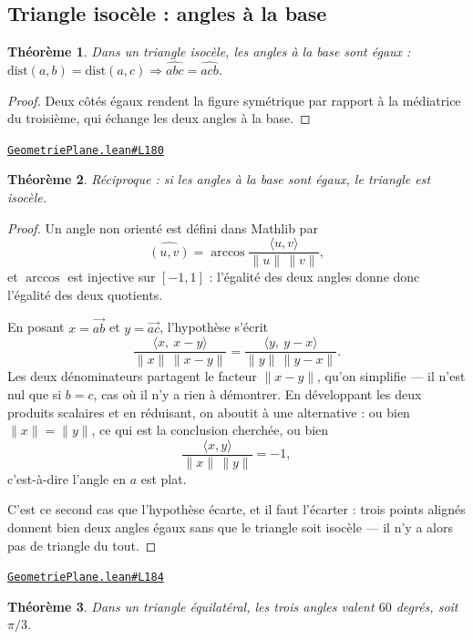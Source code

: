 \documentclass[11pt,a4paper]{article}
\theoremstyle{definition}
\theoremstyle{plain}
\newtheorem{theoreme}{Théorème}
\newcommand{\source}[2]{\par\smallskip\noindent\hfill{\footnotesize\href{#1}{\texttt{#2}}}\par\smallskip}
\begin{document}
\subsection{Triangle isocèle : angles à la base}

\begin{theoreme}
Dans un triangle isocèle, les angles à la base sont égaux :
$\mathrm{dist}(a,b) = \mathrm{dist}(a,c) \Rightarrow \widehat{abc} = \widehat{acb}$.
\end{theoreme}

\begin{proof}
Deux côtés égaux rendent la figure symétrique par rapport à la médiatrice du troisième,
qui échange les deux angles à la base.
\end{proof}
\source{https://github.com/Commutator-IO/learn-lean/blob/main/courses/01-college/02-geometrie-plane/GeometriePlane.lean\#L180}{GeometriePlane.lean\#L180}

\begin{theoreme}
Réciproque : si les angles à la base sont égaux, le triangle est isocèle.
\end{theoreme}

\begin{proof}
Un angle non orienté est défini dans Mathlib par
\[ \widehat{(u, v)} = \arccos \frac{\langle u, v\rangle}{\|u\|\,\|v\|} , \]
et $\arccos$ est injective sur $[-1, 1]$ : l'égalité des deux angles donne donc l'égalité
des deux quotients.

En posant $x = \vec{ab}$ et $y = \vec{ac}$, l'hypothèse s'écrit
\[ \frac{\langle x,\ x - y\rangle}{\|x\|\,\|x-y\|}
   = \frac{\langle y,\ y - x\rangle}{\|y\|\,\|y-x\|} . \]
Les deux dénominateurs partagent le facteur $\|x - y\|$, qu'on simplifie — il n'est nul que
si $b = c$, cas où il n'y a rien à démontrer. En développant les deux produits scalaires et
en réduisant, on aboutit à une alternative : ou bien $\|x\| = \|y\|$, ce qui est la
conclusion cherchée, ou bien
\[ \frac{\langle x, y\rangle}{\|x\|\,\|y\|} = -1 , \]
c'est-à-dire l'angle en $a$ est plat.

C'est ce second cas que l'hypothèse écarte, et il faut l'écarter : trois points alignés
donnent bien deux angles égaux sans que le triangle soit isocèle — il n'y a alors pas de
triangle du tout.
\end{proof}
\source{https://github.com/Commutator-IO/learn-lean/blob/main/courses/01-college/02-geometrie-plane/GeometriePlane.lean\#L184}{GeometriePlane.lean\#L184}

\begin{theoreme}
Dans un triangle équilatéral, les trois angles valent $60$ degrés, soit $\pi/3$.
\end{theoreme}
\end{document}
